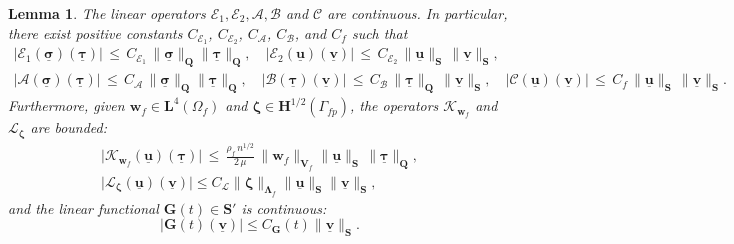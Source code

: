 \documentclass[11pt]{article}
\numberwithin{equation}{section}
\newcommand{\bLambda}{{\boldsymbol\Lambda}}
\newcommand{\bsi}{{\boldsymbol\sigma}}
\newcommand{\btau}{{\boldsymbol\tau}}
\newcommand{\bzeta}{{\boldsymbol\zeta}}
\newcommand{\ubsi}{\underline{\bsi}}
\newcommand{\ubtau}{\underline{\btau}}
\newcommand{\ubu}{\underline{\bu}}
\newcommand{\ubv}{\underline{\bv}}
\newcommand{\bv}{{\mathbf{v}}}
\newcommand{\bw}{{\mathbf{w}}}
\newcommand{\bu}{\mathbf{u}}
\newcommand{\0}{{\mathbf{0}}}
\def\bG{\mathbf{G}}
\def\bV{\mathbf{V}}
\def\bQ{\mathbf{Q}}
\def\bS{\mathbf{S}}
\newcommand{\bL}{\mathbf{L}}
\newcommand\bH{\mathbf{H}}
\newcommand{\cA}{\mathcal{A}}
\newcommand{\cB}{\mathcal{B}}
\newcommand{\cC}{\mathcal{C}}
\newcommand{\cE}{\mathcal{E}}
\newcommand{\cK}{\mathcal{K}}
\newcommand{\cL}{\mathcal{L}}
\newtheorem{lem}[thm]{Lemma}
\numberwithin{equation}{section}
\begin{document}
\begin{lem}\label{lem:cont}
The linear operators $\cE_1, \cE_2, \cA, \cB$ and $\cC$ are continuous. In particular, there exist positive constants $C_{\cE_1}$, $C_{\cE_2}$, $C_{\cA}$, $C_{\cB}$, and $C_f$ such that
\begin{gather}
 \big|\cE_1(\ubsi)(\ubtau)\big| \,\leq\, C_{\cE_1}\,\|\ubsi\|_{\bQ} \|\ubtau\|_{\bQ},\quad
 \big|\cE_2(\ubu)(\ubv)\big| \,\leq\, C_{\cE_2}\,\|\ubu\|_{\bS}\,\|\ubv\|_{\bS},
 \label{eq:continuity-cE1-cE2}\\[1ex]
    \big|\cA(\ubsi)(\ubtau)\big| \,\leq\, C_{\cA}\,\|\ubsi\|_{\bQ}\|\ubtau\|_{\bQ},\quad
\big|\cB(\ubtau)(\ubv)\big| \,\leq\, C_{\cB}\,\|\ubtau\|_{\bQ}\,\|\ubv\|_{\bS},
\quad \big|\cC(\ubu)(\ubv)\big| 
\,\leq\, C_f\,\|\ubu\|_{\bS}\,\|\ubv\|_{\bS}. \label{eq:continuity-cA-cB-cC}
  \end{gather}
%
Furthermore, given $\bw_f \in \bL^4(\Omega_f)$ and $\bzeta \in \bH^{1/2}(\Gamma_{fp})$, the operators $\cK_{\bw_f}$ and $\cL_{\bzeta}$ are bounded:
%
\begin{gather}
\big|\cK_{\bw_f}(\ubu)(\ubtau)\big|
\,\leq\, \frac{\rho_f\,n^{1/2}}{2\,\mu}\,\|\bw_f\|_{\bV_f}\|\ubu\|_{\bS}\,\|\ubtau\|_{\bQ},
\label{eq:continuity-cK-wf}\\[1ex]
\big|\cL_{\bzeta}(\ubu)(\ubv)\big|\leq C_{\cL}\|\bzeta\|_{\bLambda_f}\|\ubu\|_{\bS}\|\ubv\|_{\bS},
 \label{eq:continuity-cL-zeta}   
\end{gather}
%
and the linear functional $\bG(t) \in \bS'$ is continuous:
%
\begin{equation}\label{cont-F-G}  
  \big|\bG(t)(\ubv)\big| \leq C_{\bG}(t) \|\ubv\|_{\bS}.
\end{equation}
%
\end{lem}
\end{document}

